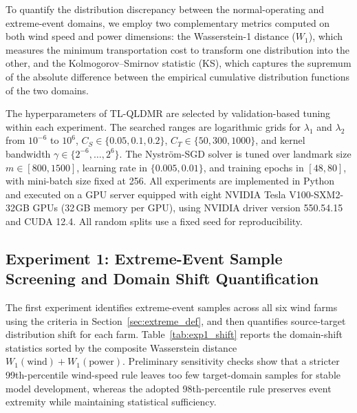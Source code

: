 To quantify the distribution discrepancy between the normal-operating and extreme-event domains, we employ two complementary metrics computed on both wind speed and power dimensions: the Wasserstein-1 distance ($W_1$), which measures the minimum transportation cost to transform one distribution into the other, and the Kolmogorov--Smirnov statistic (KS), which captures the supremum of the absolute difference between the empirical cumulative distribution functions of the two domains.

The hyperparameters of TL-QLDMR are selected by validation-based tuning within each experiment. The searched ranges are logarithmic grids for $\lambda_1$ and $\lambda_2$ from $10^{-6}$ to $10^{6}$, $C_S \in \{0.05, 0.1, 0.2\}$, $C_T \in \{50, 300, 1000\}$, and kernel bandwidth $\gamma \in \{2^{-6}, \ldots, 2^{6}\}$. The Nystr\"{o}m-SGD solver is tuned over landmark size $m \in [800, 1500]$, learning rate in $\{0.005, 0.01\}$, and training epochs in $[48, 80]$, with mini-batch size fixed at 256. All experiments are implemented in Python and executed on a GPU server equipped with eight NVIDIA Tesla V100-SXM2-32GB GPUs (32\,GB memory per GPU), using NVIDIA driver version 550.54.15 and CUDA 12.4. All random splits use a fixed seed for reproducibility.


\subsection{Experiment 1: Extreme-Event Sample Screening and Domain Shift Quantification}\label{sec:exp1}

The first experiment identifies extreme-event samples across all six wind farms using the criteria in Section~\ref{sec:extreme_def}, and then quantifies source-target distribution shift for each farm. Table~\ref{tab:exp1_shift} reports the domain-shift statistics sorted by the composite Wasserstein distance $W_1(\text{wind}) + W_1(\text{power})$. Preliminary sensitivity checks show that a stricter 99th-percentile wind-speed rule leaves too few target-domain samples for stable model development, whereas the adopted 98th-percentile rule preserves event extremity while maintaining statistical sufficiency.

